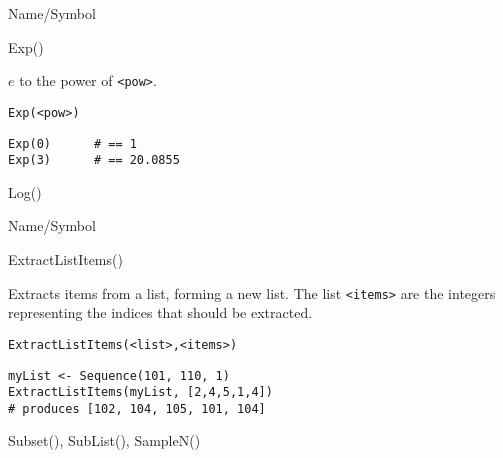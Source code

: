 \rl




\begin{desc}{Name/Symbol}
\item[Name/Symbol]  	Exp()

\item[Description]	$e$ to the power of \verb+<pow>+.

\item[Usage]
\begin{verbatim}
Exp(<pow>)
\end{verbatim}

\item[Example]
\begin{verbatim}
Exp(0) 		# == 1
Exp(3)		# == 20.0855
\end{verbatim}

\item[See Also]	Log()
\end{desc}

\rl




\begin{desc}{Name/Symbol}
\item[Name/Symbol]	ExtractListItems()

\item[Description]	Extracts items from a list, forming a new list. 
		The list \verb+<items>+ are the integers representing the
		indices that should be extracted.  
	     
\item[Usage]
\begin{verbatim}
ExtractListItems(<list>,<items>)
\end{verbatim}

\item[Example]
\begin{verbatim}
myList <- Sequence(101, 110, 1)
ExtractListItems(myList, [2,4,5,1,4])
# produces [102, 104, 105, 101, 104]
\end{verbatim}

\item[See Also]	Subset(), SubList(), SampleN()
\end{desc}

\rl





